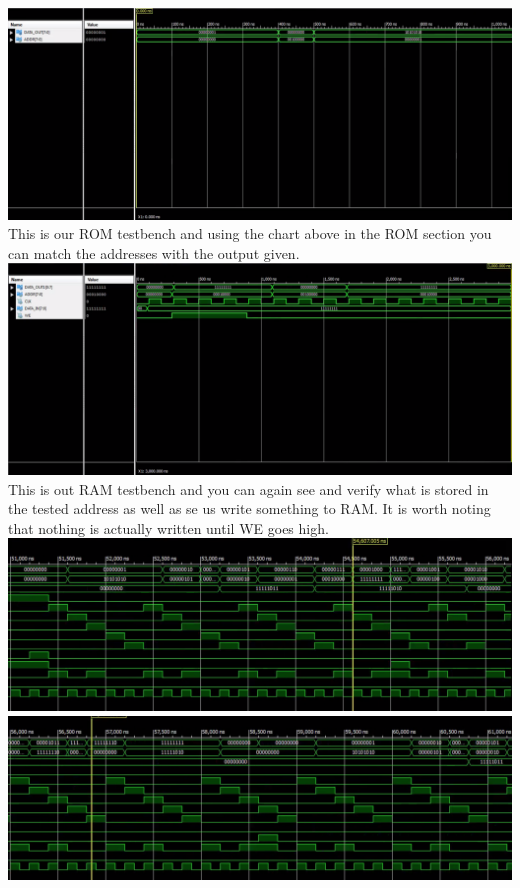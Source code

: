 \documentclass[12pt]{article}
\begin{document}
\begin{center}
	\includegraphics[scale=.3]{ROM_tb.png}\\
	This is our ROM testbench and using the chart above in the ROM section you can match the addresses with the output given.\\
	\includegraphics[scale=.3]{RAM_tb.png}\\
	This is out RAM testbench and you can again see and verify what is stored in the tested address as well as se us write something to RAM. It is worth noting that nothing is actually written until WE goes high.\\
	\newpage
	\includegraphics[scale=.4]{tb1.png}
	\includegraphics[scale=.4]{tb2.png}

\end{center}
\end{document}
